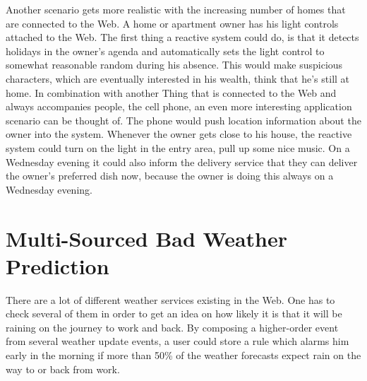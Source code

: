 Another scenario gets more realistic with the increasing number of homes that are connected to the Web.
A home or apartment owner has his light controls attached to the Web.
The first thing a reactive system could do, is that it detects holidays in the owner's agenda and automatically sets the light control to somewhat reasonable random during his absence.
This would make suspicious characters, which are eventually interested in his wealth, think that he's still at home.
In combination with another \textrm{Thing} that is connected to the Web and always accompanies people, the cell phone, an even more interesting application scenario can be thought of.
The phone would push location information about the owner into the system.
Whenever the owner gets close to his house, the reactive system could turn on the light in the entry area, pull up some nice music.
On a Wednesday evening it could also inform the delivery service that they can deliver the owner's preferred dish now, because the owner is doing this always on a Wednesday evening.




\section{Multi-Sourced Bad Weather Prediction}
There are a lot of different weather services existing in the Web.
One has to check several of them in order to get an idea on how likely it is that it will be raining on the journey to work and back.
By composing a higher-order event from several weather update events, a user could store a rule which alarms him early in the morning if more than 50\% of the weather forecasts expect rain on the way to or back from work.
